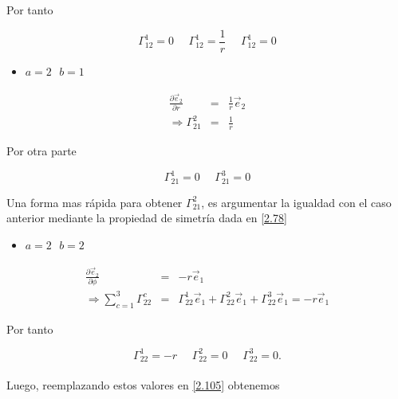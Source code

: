 \documentclass[12pt]{report}
\begin{document}
Por tanto

\begin{equation} \nonumber
\Gamma_{12}^1=0 \ \ \ \ \ \ \Gamma_{12}^1=\frac{1}{r} \ \ \ \ \ \ \Gamma_{12}^1=0
\end{equation}



\begin{itemize}
\item $a=2 \ \ \ b=1 \ \ \ $
\end{itemize}


\begin{eqnarray} \nonumber
\frac{\partial \vec{e}_2}{\partial r} &=&  \frac{1}{r} \vec{e}_2 \\ \nonumber
\Rightarrow \Gamma_{21}^2 &=& \frac{1}{r}
\end{eqnarray}

Por otra parte

\begin{equation} \nonumber
\Gamma_{21}^1=0 \ \ \ \ \ \ \Gamma_{21}^3=0 
\end{equation}

Una forma mas rápida para obtener $\Gamma_{21}^2$, es argumentar la igualdad con el caso anterior mediante la propiedad de simetría dada en \eqref{2.78}

\begin{itemize}
\item $a=2 \ \ \ b=2 \ \ \ $
\end{itemize}

\begin{eqnarray} \nonumber
\frac{\partial \vec{e}_2}{\partial \phi} &=& -r \vec{e}_1  \\ \nonumber
\Rightarrow  \sum_{c=1}^3 \Gamma_{22}^c &=& \Gamma_{22}^1\vec{e}_1 + \Gamma_{22}^2\vec{e}_1 + \Gamma_{22}^3\vec{e}_1 = -r \vec{e}_1
\end{eqnarray}

Por tanto

\begin{equation} \nonumber
\Gamma_{22}^1=-r \ \ \ \ \ \ \Gamma_{22}^2= 0 \ \ \ \ \ \ \Gamma_{22}^3=0.
\end{equation}	
\\


Luego, reemplazando estos valores en \eqref{2.105} obtenemos
\end{document}
